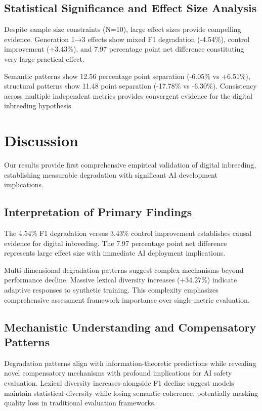 \documentclass{article}
\begin{document}
\subsection{Statistical Significance and Effect Size Analysis}

Despite sample size constraints (N=10), large effect sizes provide compelling evidence. Generation 1→3 effects show mixed F1 degradation (-4.54\%), control improvement (+3.43\%), and 7.97 percentage point net difference constituting very large practical effect.

Semantic patterns show 12.56 percentage point separation (-6.05\% vs +6.51\%), structural patterns show 11.48 point separation (-17.78\% vs -6.30\%). Consistency across multiple independent metrics provides convergent evidence for the digital inbreeding hypothesis.

\section{Discussion}

Our results provide first comprehensive empirical validation of digital inbreeding, establishing measurable degradation with significant AI development implications.

\subsection{Interpretation of Primary Findings}

The 4.54\% F1 degradation versus 3.43\% control improvement establishes causal evidence for digital inbreeding. The 7.97 percentage point net difference represents large effect size with immediate AI deployment implications.

Multi-dimensional degradation patterns suggest complex mechanisms beyond performance decline. Massive lexical diversity increases (+34.27\%) indicate adaptive responses to synthetic training. This complexity emphasizes comprehensive assessment framework importance over single-metric evaluation.

\subsection{Mechanistic Understanding and Compensatory Patterns}

Degradation patterns align with information-theoretic predictions while revealing novel compensatory mechanisms with profound implications for AI safety evaluation. Lexical diversity increases alongside F1 decline suggest models maintain statistical diversity while losing semantic coherence, potentially masking quality loss in traditional evaluation frameworks.
\end{document}
